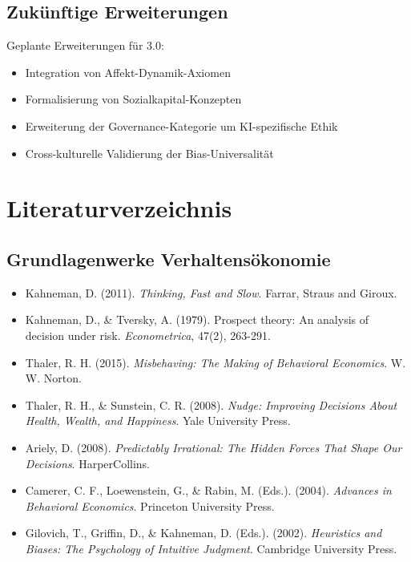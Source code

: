 \subsection{Zukünftige Erweiterungen}

Geplante Erweiterungen für \META{} 3.0:
\begin{itemize}
    \item Integration von Affekt-Dynamik-Axiomen
    \item Formalisierung von Sozialkapital-Konzepten
    \item Erweiterung der Governance-Kategorie um KI-spezifische Ethik
    \item Cross-kulturelle Validierung der Bias-Universalität
\end{itemize}


\section*{Literaturverzeichnis}

\subsection*{Grundlagenwerke Verhaltensökonomie}

\begin{itemize}[leftmargin=*]
    \item Kahneman, D. (2011). \textit{Thinking, Fast and Slow}. Farrar, Straus and Giroux.
    \item Kahneman, D., \& Tversky, A. (1979). Prospect theory: An analysis of decision under risk. \textit{Econometrica}, 47(2), 263-291.
    \item Thaler, R. H. (2015). \textit{Misbehaving: The Making of Behavioral Economics}. W. W. Norton.
    \item Thaler, R. H., \& Sunstein, C. R. (2008). \textit{Nudge: Improving Decisions About Health, Wealth, and Happiness}. Yale University Press.
    \item Ariely, D. (2008). \textit{Predictably Irrational: The Hidden Forces That Shape Our Decisions}. HarperCollins.
    \item Camerer, C. F., Loewenstein, G., \& Rabin, M. (Eds.). (2004). \textit{Advances in Behavioral Economics}. Princeton University Press.
    \item Gilovich, T., Griffin, D., \& Kahneman, D. (Eds.). (2002). \textit{Heuristics and Biases: The Psychology of Intuitive Judgment}. Cambridge University Press.
\end{itemize}

